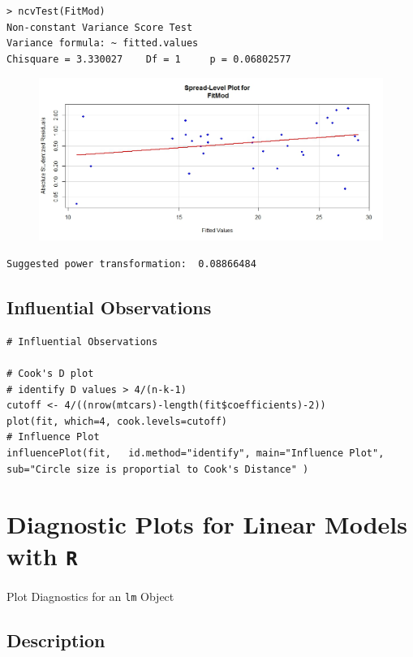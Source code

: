 \documentclass[12pt, a4paper]{article}
\theoremstyle{plain}
\theoremstyle{definition}
\theoremstyle{remark}
\begin{document}
\begin{verbatim}
> ncvTest(FitMod)
Non-constant Variance Score Test 
Variance formula: ~ fitted.values 
Chisquare = 3.330027    Df = 1     p = 0.06802577 
\end{verbatim}


\begin{figure}[h!]
\centering
\includegraphics[width=0.7\linewidth]{./mtcarsSpreadLevelPlot}
\label{mtcarsSpreadLevelPlot}
\end{figure}


\begin{verbatim}
Suggested power transformation:  0.08866484 
\end{verbatim}

\subsection{Influential Observations}
\begin{framed}
\begin{verbatim}
# Influential Observations

# Cook's D plot
# identify D values > 4/(n-k-1) 
cutoff <- 4/((nrow(mtcars)-length(fit$coefficients)-2)) 
plot(fit, which=4, cook.levels=cutoff)
# Influence Plot 
influencePlot(fit,	 id.method="identify", main="Influence Plot", sub="Circle size is proportial to Cook's Distance" )
\end{verbatim}
\end{framed}
\newpage
\section{Diagnostic Plots for Linear Models with \texttt{R}}
Plot Diagnostics for an \texttt{lm} Object

\subsection{Description}
\end{document}
